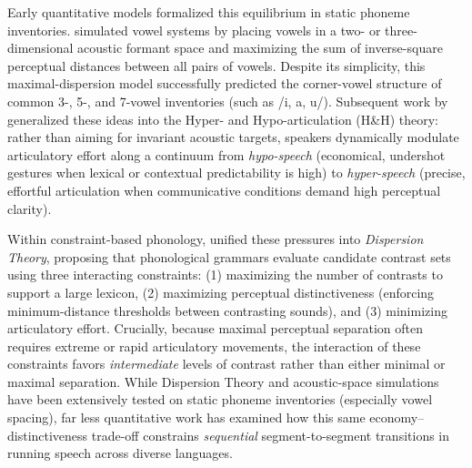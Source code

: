 \documentclass[11pt,a4paper,leqno]{article}
\begin{document}
Early quantitative models formalized this equilibrium in static phoneme inventories. \citet{liljencrants1972} simulated vowel systems by placing vowels in a two- or three-dimensional acoustic formant space and maximizing the sum of inverse-square perceptual distances between all pairs of vowels. Despite its simplicity, this maximal-dispersion model successfully predicted the corner-vowel structure of common \mbox{3-}, \mbox{5-}, and \mbox{7-vowel} inventories (such as /i, a, u/). Subsequent work by \citet{lindblom1990} generalized these ideas into the Hyper- and Hypo-articulation (H\&H) theory: rather than aiming for invariant acoustic targets, speakers dynamically modulate articulatory effort along a continuum from \emph{hypo-speech} (economical, undershot gestures when lexical or contextual predictability is high) to \emph{hyper-speech} (precise, effortful articulation when communicative conditions demand high perceptual clarity).

Within constraint-based phonology, \citet{flemming2004} unified these pressures into \emph{Dispersion Theory}, proposing that phonological grammars evaluate candidate contrast sets using three interacting constraints: (1) maximizing the number of contrasts to support a large lexicon, (2) maximizing perceptual distinctiveness (enforcing minimum-distance thresholds between contrasting sounds), and (3) minimizing articulatory effort. Crucially, because maximal perceptual separation often requires extreme or rapid articulatory movements, the interaction of these constraints favors \emph{intermediate} levels of contrast rather than either minimal or maximal separation. While Dispersion Theory and acoustic-space simulations have been extensively tested on static phoneme inventories (especially vowel spacing), far less quantitative work has examined how this same economy--distinctiveness trade-off constrains \emph{sequential} segment-to-segment transitions in running speech across diverse languages.
\end{document}
